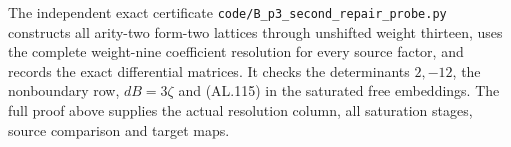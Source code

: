 The independent exact certificate
\texttt{code/B\_p3\_second\_repair\_probe.py} constructs all
arity-two form-two lattices through unshifted weight thirteen,
uses the complete weight-nine coefficient resolution for every
source factor, and records the exact differential matrices.
It checks the determinants $2,-12$, the nonboundary row,
$dB=3\zeta$ and (AL.115) in the saturated free embeddings.
The full proof above supplies the actual resolution column,
all saturation stages, source comparison and target maps.
